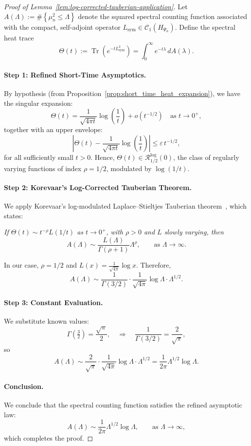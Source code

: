 \begin{proof}[Proof of Lemma~\ref{lem:log-corrected-tauberian-application}]
Let \( A(\Lambda) := \#\left\{ \mu_n^2 \le \Lambda \right\} \) denote the squared spectral counting function associated with the compact, self-adjoint operator \( L_{\mathrm{sym}} \in \mathcal{C}_1(H_{\Psi_\alpha}) \). Define the spectral heat trace
\[
\Theta(t) := \operatorname{Tr}(e^{-t L_{\mathrm{sym}}^2}) = \int_0^\infty e^{-t \lambda} \, dA(\lambda).
\]

\paragraph{Step 1: Refined Short-Time Asymptotics.}
By hypothesis (from Proposition~\ref{prop:short_time_heat_expansion}), we have the singular expansion:
\[
\Theta(t) = \frac{1}{\sqrt{4\pi t}} \log\left( \frac{1}{t} \right) + o(t^{-1/2}) \quad \text{as } t \to 0^+,
\]
together with an upper envelope:
\[
\left| \Theta(t) - \frac{1}{\sqrt{4\pi t}} \log\left( \frac{1}{t} \right) \right| \leq \varepsilon \, t^{-1/2},
\]
for all sufficiently small \( t > 0 \). Hence, \( \Theta(t) \in \mathcal{R}_{1/2}^{\log}(0) \), the class of regularly varying functions of index \( \rho = 1/2 \), modulated by \( \log(1/t) \).

\paragraph{Step 2: Korevaar's Log-Corrected Tauberian Theorem.}
We apply Korevaar’s log-modulated Laplace–Stieltjes Tauberian theorem~\cite[Ch.~III, §5, Thm.~5.5]{Korevaar2004Tauberian}, which states:

\medskip
\emph{If \( \Theta(t) \sim t^{-\rho} L(1/t) \) as \( t \to 0^+ \), with \( \rho > 0 \) and \( L \) slowly varying, then}
\[
A(\Lambda) \sim \frac{L(\Lambda)}{\Gamma(\rho+1)} \Lambda^{\rho}, \qquad \text{as } \Lambda \to \infty.
\]

\medskip
In our case, \( \rho = 1/2 \) and \( L(x) = \frac{1}{\sqrt{4\pi}} \log x \). Therefore,
\[
A(\Lambda) \sim \frac{1}{\Gamma(3/2)} \cdot \frac{1}{\sqrt{4\pi}} \log \Lambda \cdot \Lambda^{1/2}.
\]

\paragraph{Step 3: Constant Evaluation.}
We substitute known values:
\[
\Gamma\left( \tfrac{3}{2} \right) = \frac{\sqrt{\pi}}{2}, \quad \Rightarrow \quad \frac{1}{\Gamma(3/2)} = \frac{2}{\sqrt{\pi}},
\]
so
\[
A(\Lambda) \sim \frac{2}{\sqrt{\pi}} \cdot \frac{1}{\sqrt{4\pi}} \log \Lambda \cdot \Lambda^{1/2}
= \frac{1}{2\pi} \Lambda^{1/2} \log \Lambda.
\]

\paragraph{Conclusion.}
We conclude that the spectral counting function satisfies the refined asymptotic law:
\[
A(\Lambda) \sim \frac{1}{2\pi} \Lambda^{1/2} \log \Lambda, \qquad \text{as } \Lambda \to \infty,
\]
which completes the proof.
\end{proof}
